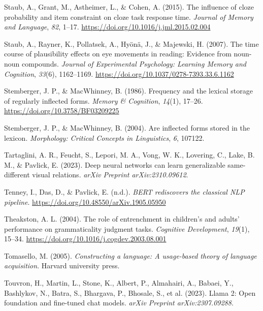 \documentclass[
  12pt,
  letterpaper,
]{scrreprt}
\newlength{\cslhangindent}
\newenvironment{CSLReferences}[2] %
 {\begin{list}{}{%
  \setlength{\itemindent}{0pt}
  \setlength{\leftmargin}{0pt}
  \setlength{\parsep}{0pt}
  \ifodd #1
   \setlength{\leftmargin}{\cslhangindent}
   \setlength{\itemindent}{-1\cslhangindent}
  \fi
  \setlength{\itemsep}{#2\baselineskip}}}
 {\end{list}}
\begin{document}
\begin{CSLReferences}{1}{0}
Staub, A., Grant, M., Astheimer, L., \& Cohen, A. (2015). The influence
of cloze probability and item constraint on cloze task response time.
\emph{Journal of Memory and Language}, \emph{82}, 1--17.
\url{https://doi.org/10.1016/j.jml.2015.02.004}

Staub, A., Rayner, K., Pollatsek, A., Hyönä, J., \& Majewski, H. (2007).
The time course of plausibility effects on eye movements in reading:
Evidence from noun-noun compounds. \emph{Journal of Experimental
Psychology: Learning Memory and Cognition}, \emph{33}(6), 1162--1169.
\url{https://doi.org/10.1037/0278-7393.33.6.1162}

Stemberger, J. P., \& MacWhinney, B. (1986). Frequency and the lexical
storage of regularly inflected forms. \emph{Memory \& Cognition},
\emph{14}(1), 17--26. \url{https://doi.org/10.3758/BF03209225}

Stemberger, J. P., \& MacWhinney, B. (2004). Are inflected forms stored
in the lexicon. \emph{Morphology: Critical Concepts in Linguistics},
\emph{6}, 107122.

Tartaglini, A. R., Feucht, S., Lepori, M. A., Vong, W. K., Lovering, C.,
Lake, B. M., \& Pavlick, E. (2023). Deep neural networks can learn
generalizable same-different visual relations. \emph{arXiv Preprint
arXiv:2310.09612}.

Tenney, I., Das, D., \& Pavlick, E. (n.d.). \emph{BERT rediscovers the
classical NLP pipeline}. \url{https://doi.org/10.48550/arXiv.1905.05950}

Theakston, A. L. (2004). The role of entrenchment in children{'}s and
adults{'} performance on grammaticality judgment tasks. \emph{Cognitive
Development}, \emph{19}(1), 15--34.
\url{https://doi.org/10.1016/j.cogdev.2003.08.001}

Tomasello, M. (2005). \emph{Constructing a language: A usage-based
theory of language acquisition}. Harvard university press.

Touvron, H., Martin, L., Stone, K., Albert, P., Almahairi, A., Babaei,
Y., Bashlykov, N., Batra, S., Bhargava, P., Bhosale, S., et al. (2023).
Llama 2: Open foundation and fine-tuned chat models. \emph{arXiv
Preprint arXiv:2307.09288}.


\end{CSLReferences}
\end{document}
